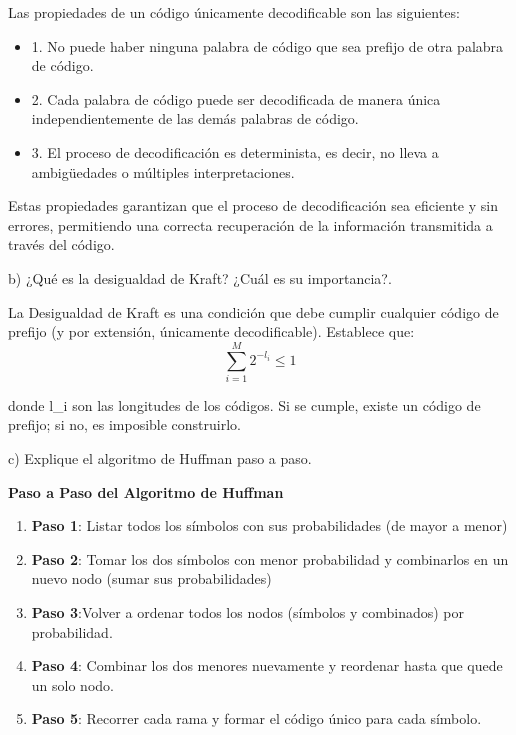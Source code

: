 Las propiedades de un código únicamente decodificable son las siguientes:
\begin{itemize}
\item 1. No puede haber ninguna palabra de código que sea prefijo de otra palabra de código.
\item 2. Cada palabra de código puede ser decodificada de manera única independientemente de las demás palabras de código.
\item 3. El proceso de decodificación es determinista, es decir, no lleva a ambigüedades o múltiples interpretaciones.
\end{itemize}
\bigskip
Estas propiedades garantizan que el proceso de decodificación sea eficiente y sin errores, permitiendo una correcta recuperación de la información transmitida a través del código.
\bigskip

\noindent b) ¿Qué es la desigualdad de Kraft? ¿Cuál es su importancia?. \par
\bigskip

La Desigualdad de Kraft es una condición que debe cumplir cualquier código de prefijo (y por extensión, únicamente decodificable). Establece que:
    \[
\sum_{i=1}^{M} 2^{-l_i} \leq 1
\]

donde l\_i son las longitudes de los códigos. Si se cumple, existe un código de prefijo; si no, es imposible construirlo.

\bigskip
\noindent c) Explique el algoritmo de Huffman paso a paso. \par
\bigskip

\noindent \textbf{Paso a Paso del Algoritmo de Huffman}
\begin{enumerate}
    \item \textbf{Paso 1}: Listar todos los símbolos con sus probabilidades (de mayor a menor) 
    \item \textbf{Paso 2}: Tomar los dos símbolos con menor probabilidad y combinarlos en un nuevo nodo (sumar sus probabilidades)
    \item \textbf{Paso 3}:Volver a ordenar todos los nodos (símbolos y combinados) por probabilidad.
    \item \textbf{Paso 4}: Combinar los dos menores nuevamente y reordenar hasta que quede un solo nodo.
    \item \textbf{Paso 5}: Recorrer cada rama y formar el código único para cada símbolo.
    
    
\end{enumerate}







